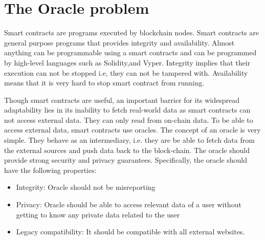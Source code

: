\documentclass[twoside]{article}
\renewcommand{\cite}[1]{[#1]}
\def\beginrefs{\begin{list}%
		{[\arabic{equation}]}{\usecounter{equation}
			\setlength{\leftmargin}{2.0truecm}\setlength{\labelsep}{0.4truecm}%
			\setlength{\labelwidth}{1.6truecm}}}
\def\endrefs{\end{list}}
\def\bibentry#1{\item[\hbox{[#1]}]}
\begin{document}
\begin{comment}
	This concludes the proof.
	\end{proof}
	
	
	\section{Next topic}
	
	Here is a citation, just for fun~\cite{CW87}.
	
	\section*{References}
	\beginrefs
	\bibentry{CW87}{\sc D.~Coppersmith} and {\sc S.~Winograd}, 
	``Matrix multiplication via arithmetic progressions,''
	{\it Proceedings of the 19th ACM Symposium on Theory of Computing},
	1987, pp.~1--6.
	\endrefs
	
	
	\end{comment}
	
	
	
	
	\section{The Oracle problem}
	Smart contracts are programs executed by blockchain nodes. Smart contracts are general purpose programs that provides integrity and availability.
	Almost anything can be programmable using a smart contracts and can be programmed by high-level languages such as Solidity,and Vyper.
	Integrity implies that their execution can not be stopped i.e, they can not be tampered with.
	Availability means that it is very hard to stop smart contract from running.
	
	Though smart contracts are useful, an important barrier for its widespread adaptability lies in its inability to fetch real-world data as smart contracts can not access external data. They can only read from on-chain data.
	To be able to access external data, smart contracts use oracles. 
	The concept of an oracle is very simple. They behave as an intermediary, i.e. they are be able to fetch data from the external sources and push data back to the block-chain.
	The oracle should provide strong security and privacy guarantees.
	Specifically, the oracle should have the following properties:
	\begin{itemize}
		\item Integrity: Oracle should not be misreporting
		\item Privacy: Oracle should be able to access relevant data of a user without getting to know any private data related to the user
		\item Legacy compatibility: It should be compatible with all external websites.
	\end{itemize}
	
\end{document}
